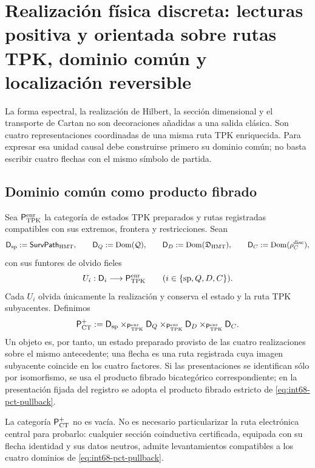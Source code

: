 \section[Realización física discreta sobre rutas TPK]{Realización física
discreta: lecturas positiva y orientada sobre rutas TPK, dominio común y
localización reversible}
\label{sec:int68-realizacion-fisica-discreta}

La forma espectral, la realización de Hilbert, la sección dimensional y el
transporte de Cartan no son decoraciones añadidas a una salida clásica. Son
cuatro representaciones coordinadas de una misma ruta TPK enriquecida. Para
expresar esa unidad causal debe construirse primero su dominio común; no
basta escribir cuatro flechas con el mismo símbolo de partida.

\subsection{Dominio común como producto fibrado}

Sea \(\mathsf P_{\rm TPK}^{\rm enr}\) la categoría de estados TPK preparados
y rutas registradas compatibles con sus extremos, frontera y restricciones.
Sean
\[
 \mathsf D_{\rm sp}:=\mathsf{SurvPath}_{\rm HMT},\qquad
 \mathsf D_Q:=\operatorname{Dom}(\mathcal Q),\qquad
 \mathsf D_D:=\operatorname{Dom}(\mathfrak D_{\rm HMT}),\qquad
 \mathsf D_C:=\operatorname{Dom}(\rho_C^{\rm disc}),
\]
con sus funtores de olvido fieles
\[
 U_i:\mathsf D_i\longrightarrow\mathsf P_{\rm TPK}^{\rm enr}
 \qquad(i\in\{{\rm sp},Q,D,C\}).
\]
Cada \(U_i\) olvida únicamente la realización y conserva el estado y la ruta
TPK subyacentes. Definimos
\begin{equation}
 \mathsf P_{\rm CT}^{+}
 :=
 \mathsf D_{\rm sp}
 \times_{\mathsf P_{\rm TPK}^{\rm enr}}\mathsf D_Q
 \times_{\mathsf P_{\rm TPK}^{\rm enr}}\mathsf D_D
 \times_{\mathsf P_{\rm TPK}^{\rm enr}}\mathsf D_C.
 \label{eq:int68-pct-pullback}
\end{equation}
Un objeto es, por tanto, un estado preparado provisto de las cuatro
realizaciones sobre el mismo antecedente; una flecha es una ruta registrada
cuya imagen subyacente coincide en los cuatro factores. Si las
presentaciones se identifican sólo por isomorfismo, se usa el producto
fibrado bicategórico correspondiente; en la presentación fijada del registro
se adopta el producto fibrado estricto de
\eqref{eq:int68-pct-pullback}.

\begin{proposition}
\label{prop:int68-pct-no-vacio}
La categoría \(\mathsf P_{\rm CT}^{+}\) no es vacía. No es necesario
particularizar la ruta electrónica central para probarlo: cualquier sección
coinductiva certificada, equipada con su flecha identidad y sus datos neutros, admite
levantamientos compatibles a los cuatro dominios de
\eqref{eq:int68-pct-pullback}.
\end{proposition}

